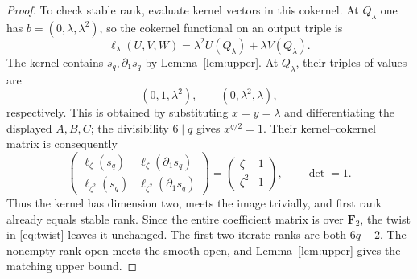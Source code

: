 \documentclass[11pt]{article}
\theoremstyle{definition}\newtheorem{definition}[theorem]{Definition}
\theoremstyle{remark}\newtheorem{remark}[theorem]{Remark}
\newcommand{\FF}{\mathbf F}
\begin{document}
\begin{proof}
To check stable rank, evaluate kernel vectors in this cokernel. At $Q_\lambda$ one has $b=(0,\lambda,\lambda^2)$, so the cokernel functional on an output triple is
\[
        \ell_\lambda(U,V,W)=\lambda^2U(Q_\lambda)+\lambda V(Q_\lambda).
\]
The kernel contains $s_q,\partial_1s_q$ by Lemma~\ref{lem:upper}. At $Q_\lambda$, their triples of values are
\[
                (0,1,\lambda^2),\qquad(0,\lambda^2,\lambda),
\]
respectively. This is obtained by substituting $x=y=\lambda$ and differentiating the displayed $A,B,C$; the divisibility $6\mid q$ gives $x^{q/2}=1$. Their kernel--cokernel matrix is consequently
\[
 \begin{pmatrix}\ell_\zeta(s_q)&\ell_\zeta(\partial_1s_q)\\
 \ell_{\zeta^2}(s_q)&\ell_{\zeta^2}(\partial_1s_q)\end{pmatrix}
 =\begin{pmatrix}\zeta&1\\\zeta^2&1\end{pmatrix},\qquad\det=1.
\]
Thus the kernel has dimension two, meets the image trivially, and first rank already equals stable rank. Since the entire coefficient matrix is over $\FF_2$, the twist in \eqref{eq:twist} leaves it unchanged. The first two iterate ranks are both $6q-2$. The nonempty rank open meets the smooth open, and Lemma~\ref{lem:upper} gives the matching upper bound.
\end{proof}
\end{document}
